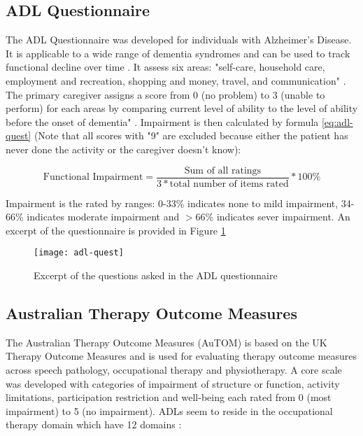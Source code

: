 \subsection{ADL Questionnaire}
The ADL Questionnaire was developed for individuals with Alzheimer's Disease. It is applicable to a wide range of dementia syndromes and can be used to track functional decline over time \cite{kennedy_activities_2004}. It assess six areas: "self-care, household care, employment and recreation, shopping and money, travel, and communication" \cite{kennedy_activities_2004}. The primary caregiver assigns a score from 0 (no problem) to 3 (unable to perform) for each areas by comparing current level of ability to the level of ability before the onset of dementia" \cite{kennedy_activities_2004}. Impairment is then calculated by formula \ref{eq:adl-quest} (Note that all scores with "9" are excluded because either the patient has never done the activity or the caregiver doesn't know): 

\begin{equation}
    \text{Functional Impairment} = \frac{\text{Sum of all ratings}}{3 * \text{total number of items rated}} * 100\%
    \label{eq:adl-quest}
\end{equation}

Impairment is the rated by ranges: 0-33\% indicates none to mild impairment, 34-66\% indicates moderate impairment and $>66\%$ indicates sever impairment. An excerpt of the questionnaire is provided in Figure \ref{fig:adl-quest}

\begin{figure}[ht]
    \centering
    \texttt{[image: adl-quest]}
    \caption{Excerpt of the questions asked in the ADL questionnaire~\cite{kennedy_activities_2004}}
    \label{fig:adl-quest}
\end{figure}

\clearpage
\subsection{Australian Therapy Outcome Measures}
The Australian Therapy Outcome Measures (AuTOM) is based on the UK Therapy Outcome Measures \cite{perry_therapy_2004} and is used for evaluating therapy outcome measures across speech pathology, occupational therapy and physiotherapy. A core scale was developed with categories of impairment of structure or function, activity limitations, participation restriction and well-being each rated from 0 (most impairment) to 5 (no impairment). ADLs seem to reside in the occupational therapy domain which have 12 domains \cite{perry_therapy_2004}:

